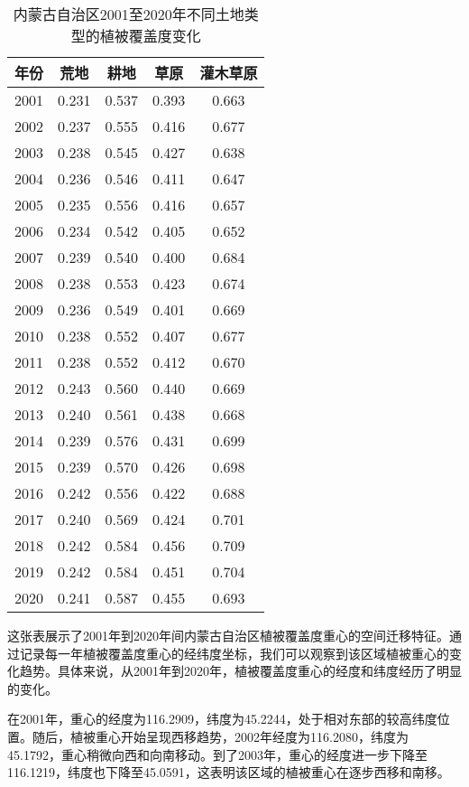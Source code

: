 \documentclass[AutoFakeBold]{LZUThesis-PgD&PhD}
\begin{document}
		\begin{table}[H]
			\centering
			\begin{tabular}{|c|c|c|c|c|}
				\hline
				\textbf{年份} & \textbf{荒地} & \textbf{耕地} & \textbf{草原} & \textbf{灌木草原} \\
				\hline
				2001 & 0.231 & 0.537 & 0.393 & 0.663 \\
				2002 & 0.237 & 0.555 & 0.416 & 0.677 \\
				2003 & 0.238 & 0.545 & 0.427 & 0.638 \\
				2004 & 0.236 & 0.546 & 0.411 & 0.647 \\
				2005 & 0.235 & 0.556 & 0.416 & 0.657 \\
				2006 & 0.234 & 0.542 & 0.405 & 0.652 \\
				2007 & 0.239 & 0.540 & 0.400 & 0.684 \\
				2008 & 0.238 & 0.553 & 0.423 & 0.674 \\
				2009 & 0.236 & 0.549 & 0.401 & 0.669 \\
				2010 & 0.238 & 0.552 & 0.407 & 0.677 \\
				2011 & 0.238 & 0.552 & 0.412 & 0.670 \\
				2012 & 0.243 & 0.560 & 0.440 & 0.669 \\
				2013 & 0.240 & 0.561 & 0.438 & 0.668 \\
				2014 & 0.239 & 0.576 & 0.431 & 0.699 \\
				2015 & 0.239 & 0.570 & 0.426 & 0.698 \\
				2016 & 0.242 & 0.556 & 0.422 & 0.688 \\
				2017 & 0.240 & 0.569 & 0.424 & 0.701 \\
				2018 & 0.242 & 0.584 & 0.456 & 0.709 \\
				2019 & 0.242 & 0.584 & 0.451 & 0.704 \\
				2020 & 0.241 & 0.587 & 0.455 & 0.693 \\
				\hline
			\end{tabular}
			\caption{内蒙古自治区2001至2020年不同土地类型的植被覆盖度变化}
		\end{table}

		
		这张表展示了2001年到2020年间内蒙古自治区植被覆盖度重心的空间迁移特征。通过记录每一年植被覆盖度重心的经纬度坐标，我们可以观察到该区域植被重心的变化趋势。具体来说，从2001年到2020年，植被覆盖度重心的经度和纬度经历了明显的变化。
		
		在2001年，重心的经度为116.2909，纬度为45.2244，处于相对东部的较高纬度位置。随后，植被重心开始呈现西移趋势，2002年经度为116.2080，纬度为45.1792，重心稍微向西和向南移动。到了2003年，重心的经度进一步下降至116.1219，纬度也下降至45.0591，这表明该区域的植被重心在逐步西移和南移。
		
\end{document}
